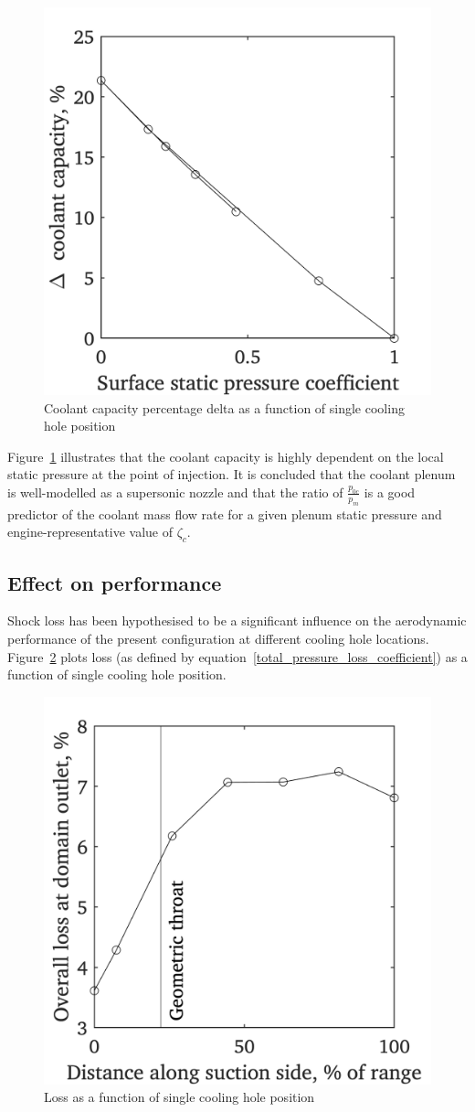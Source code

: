 \documentclass[a4paper, 11pt, oneside]{report}
\begin{document}
\begin{figure}[H]
      \centering
      \includegraphics[width=.45\textwidth]{figs/sch_static_pressure_coefficient_vs_coolant_capacity.png}
      \caption{Coolant capacity percentage delta as a function of single cooling hole position}
      \label{fig:sch_static_pressure_coefficient_vs_coolant_capacity}
\end{figure}

Figure~\ref{fig:sch_static_pressure_coefficient_vs_coolant_capacity} illustrates that the coolant capacity is highly dependent on the local static pressure at the point of injection. It is concluded that the coolant plenum is well-modelled as a supersonic nozzle and that the ratio of $\frac{p_{0c}}{p_m}$ is a good predictor of the coolant mass flow rate for a given plenum static pressure and engine-representative value of $\zeta_c$.

\subsection{Effect on performance}
    
Shock loss has been hypothesised to be a significant influence on the aerodynamic performance of the present configuration at different cooling hole locations. Figure~\ref{fig:sch_hole_location_vs_loss} plots loss (as defined by equation~\ref{total_pressure_loss_coefficient}) as a function of single cooling hole position.
    
    \begin{figure}[H]
      \centering
      \includegraphics[width=.45\textwidth]{figs/sch_hole_location_vs_loss.png}
      \caption{Loss as a function of single cooling hole position}
      \label{fig:sch_hole_location_vs_loss}
\end{figure}
\end{document}

